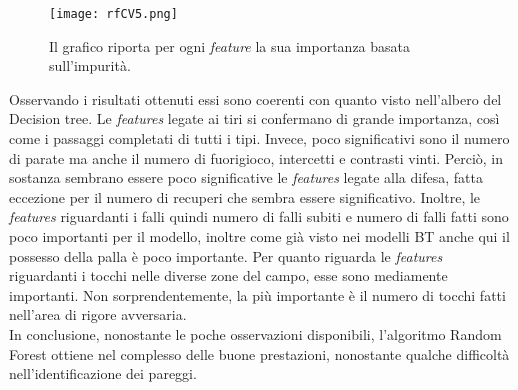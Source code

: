 \begin{figure}[]
	\begin{center}
		\texttt{[image: rfCV5.png]}
		\caption{Il grafico riporta per ogni \emph{feature} la sua importanza basata sull'impurità.
		} 
		\label{fig:rftree}
	\end{center}
\end{figure}
Osservando i risultati ottenuti essi sono coerenti con quanto visto nell'albero del Decision tree. Le \emph{features} legate ai tiri si confermano di grande importanza, così come i passaggi completati di tutti i tipi. Invece, poco significativi sono il numero di parate ma anche il numero di fuorigioco, intercetti e contrasti vinti. Perciò, in sostanza sembrano essere poco significative le \emph{features} legate alla difesa, fatta eccezione per il numero di recuperi che sembra essere significativo. Inoltre, le \emph{features} riguardanti i falli quindi numero di falli subiti e numero di falli fatti sono poco importanti per il modello, inoltre come già visto nei modelli BT anche qui il possesso della palla è poco importante. Per quanto riguarda le \emph{features} riguardanti i tocchi nelle diverse zone del campo, esse sono mediamente importanti. Non sorprendentemente, la più importante è il numero di tocchi fatti nell'area di rigore avversaria. \\
In conclusione, nonostante le poche osservazioni disponibili, l'algoritmo Random Forest ottiene nel complesso delle buone prestazioni, nonostante qualche difficoltà nell’identificazione dei pareggi.

